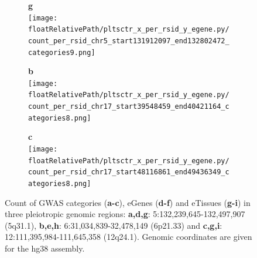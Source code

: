 \begin{figure}[!tbp]
\begin{subfigure}[]{.32\textwidth}
\textbf{g}
\\
\texttt{[image: \\floatRelativePath/pltsctr\_x\_per\_rsid\_y\_egene.py/count\_per\_rsid\_chr5\_start131912097\_end132802472\_categories9.png]}
\end{subfigure}
%
\begin{subfigure}[]{.32\textwidth}
\textbf{b}
\\
\texttt{[image: \\floatRelativePath/pltsctr\_x\_per\_rsid\_y\_egene.py/count\_per\_rsid\_chr17\_start39548459\_end40421164\_categories8.png]}
\end{subfigure}
%
\begin{subfigure}[]{.32\textwidth}
\textbf{c}
\\
\texttt{[image: \\floatRelativePath/pltsctr\_x\_per\_rsid\_y\_egene.py/count\_per\_rsid\_chr17\_start48116861\_end49436349\_categories8.png]}
\end{subfigure}

\caption{Count of GWAS categories (\textbf{a-c}), eGenes (\textbf{d-f}) and eTissues (\textbf{g-i}) in three pleiotropic genomic regions: \textbf{a,d,g}: 5:132,239,645-132,497,907 (5q31.1), \textbf{b,e,h}: 6:31,034,839-32,478,149 (6p21.33) and \textbf{c,g,i}: 12:111,395,984-111,645,358 (12q24.1). Genomic coordinates are given for the hg38 assembly.} \label{fig:region_gwas_egenes_tissues}
%
\end{figure}
%
%
